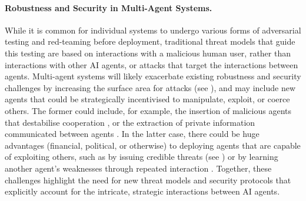 \paragraph{Robustness and Security in Multi-Agent Systems.}
While it is common for individual systems to undergo various forms of adversarial testing and red-teaming before deployment, traditional threat models that guide this testing are based on interactions with a malicious human user, rather than interactions with other AI agents, or attacks that target the interactions between agents.
Multi-agent systems will likely exacerbate existing robustness and security challenges by increasing the surface area for attacks (see ), and may include new agents that could be strategically incentivised to manipulate, exploit, or coerce others.
The former could include, for example, the insertion of malicious agents that destabilise cooperation \citep{Huang2024,Barbi2025}, or the extraction of private information communicated between agents \citep{shao2024privacylens,wu_inference_2024,wei_trustworthy_2024}.
In the latter case, there could be huge advantages (financial, political, or otherwise) to deploying agents that are capable of exploiting others, such as by issuing credible threats (see ) or by learning another agent's weaknesses through repeated interaction \citep{Gleave2020}.
Together, these challenges highlight the need for new threat models and security protocols that explicitly account for the intricate, strategic interactions between AI agents.





